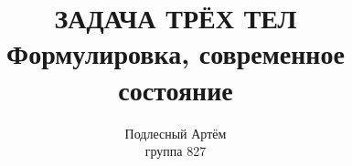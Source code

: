\documentclass[a4paper, 12pt]{article}%
\author{Подлесный Артём \\ группа 827}
\title{ЗАДАЧА ТРЁХ ТЕЛ \\ Формулировка, современное состояние}
\begin{document}
\begin{figure}[h!]
\end{figure}

\begin{figure}[h!]
\end{figure}

\begin{figure}[h!]
\end{figure}
\end{document}

